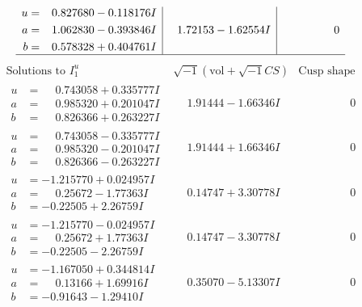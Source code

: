 \documentclass[1p]{elsarticle_modified}
\theoremstyle{definition}
\newcommand{\I}{\sqrt{-1}}
\begin{document}
$$\begin{array}{c|c|c}
\begin{aligned}
u &= \phantom{-}0.827680 - 0.118176 I \\
a &= \phantom{-}1.062830 - 0.393846 I \\
b &= \phantom{-}0.578328 + 0.404761 I\end{aligned}
 & \phantom{-}1.72153 - 1.62554 I & \phantom{-0.000000 } 0\\
 \hline 
 \end{array}$$\newpage$$\begin{array}{c|c|c}  
\text{Solutions to }I^u_{1}& \I (\text{vol} + \sqrt{-1}CS) & \text{Cusp shape}\\
 \hline 
\begin{aligned}
u &= \phantom{-}0.743058 + 0.335777 I \\
a &= \phantom{-}0.985320 + 0.201047 I \\
b &= \phantom{-}0.826366 + 0.263227 I\end{aligned}
 & \phantom{-}1.91444 - 1.66346 I & \phantom{-0.000000 } 0 \\ \hline\begin{aligned}
u &= \phantom{-}0.743058 - 0.335777 I \\
a &= \phantom{-}0.985320 - 0.201047 I \\
b &= \phantom{-}0.826366 - 0.263227 I\end{aligned}
 & \phantom{-}1.91444 + 1.66346 I & \phantom{-0.000000 } 0 \\ \hline\begin{aligned}
u &= -1.215770 + 0.024957 I \\
a &= \phantom{-}0.25672 - 1.77363 I \\
b &= -0.22505 + 2.26759 I\end{aligned}
 & \phantom{-}0.14747 + 3.30778 I & \phantom{-0.000000 } 0 \\ \hline\begin{aligned}
u &= -1.215770 - 0.024957 I \\
a &= \phantom{-}0.25672 + 1.77363 I \\
b &= -0.22505 - 2.26759 I\end{aligned}
 & \phantom{-}0.14747 - 3.30778 I & \phantom{-0.000000 } 0 \\ \hline\begin{aligned}
u &= -1.167050 + 0.344814 I \\
a &= \phantom{-}0.13166 + 1.69916 I \\
b &= -0.91643 - 1.29410 I\end{aligned}
 & \phantom{-}0.35070 - 5.13307 I & \phantom{-0.000000 } 0 \\ \hline\begin{aligned}

\end{aligned}
\end{array}$$
\end{document}
